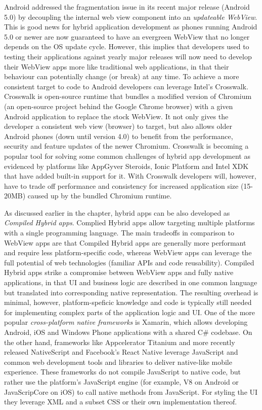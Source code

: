 \documentclass[thesis.tex]{subfiles}
\begin{document}
Android addressed the fragmentation issue in its recent major release (Android 5.0) by decoupling the internal web view component into an \textit{updateable WebView}. This is good news for hybrid application development as phones running Android 5.0 or newer are now guaranteed to have an evergreen WebView that no longer depends on the OS update cycle. However, this implies that developers used to testing their applications against yearly major releases will now need to develop their WebView apps more like traditional web applications, in that their behaviour can potentially change (or break) at any time. To achieve a more consistent target to code to Android developers can leverage Intel's Crosswalk. Crosswalk is open-source runtime that bundles a modified version of Chromium (an open-source project behind the Google Chrome browser) with a given Android application to replace the stock WebView. It not only gives the developer a consistent web view (browser) to target, but also allows older Android phones (down until version 4.0) to benefit from the performance, security and feature updates of the newer Chromium. Crosswalk is becoming a popular tool for solving some common challenges of hybrid app development as evidenced by platforms like AppGyver Steroids, Ionic Platform and Intel XDK that have added built-in support for it. With Crosswalk developers will, however, have to trade off performance and consistency for increased application size (15-20MB) caused up by the bundled Chromium runtime.

As discussed earlier in the chapter, hybrid apps can be also developed as \textit{Compiled Hybrid apps}. Complied Hybrid apps allow targeting multiple platforms with a single programming language. The main tradeoffs in comparison to WebView apps are that Compiled Hybrid apps are generally more performant and require less platform-specific code, whereas WebView apps can leverage the full potential of web technologies (familiar APIs and code reusability). Compiled Hybrid apps strike a compromise between WebView apps and fully native applications, in that UI and business logic are described in one common language but translated into corresponding native representation. The resulting overhead is minimal, however, platform-speficic knowledge and code is typically still needed for implementing complex parts of the application logic and UI. One of the more popular \textit{cross-platform native frameworks} is Xamarin, which allows developing Android, iOS and Windows Phone applications with a shared C\# codebase. On the other hand, frameworks like Appcelerator Titanium and more recently released NativeScript and Facebook's React Native leverage JavaScript and common web development tools and libraries to deliver native-like mobile experience. These frameworks do not compile JavaScript to native code, but rather use the platform's JavaScript engine (for example, V8 on Android or JavaScripCore on iOS) to call native methods from JavaScript. For styling the UI they leverage XML and a subset CSS or their own implementation thereof.
\end{document}
